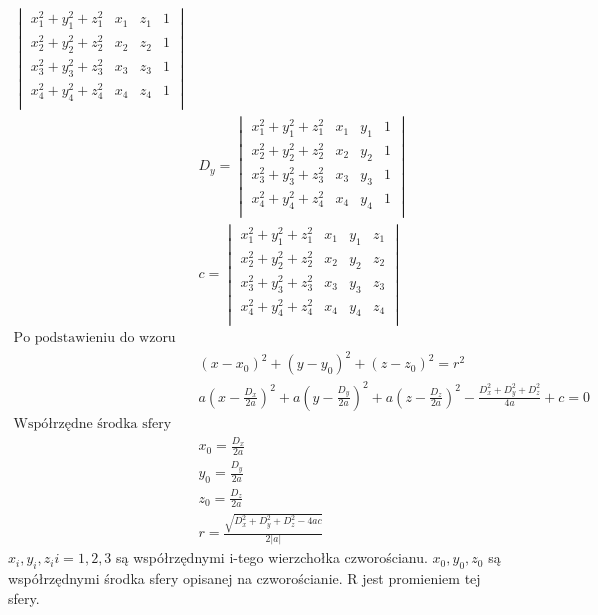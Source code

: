 \begin{equation}
\begin{aligned}
\begin{vmatrix}
                x_{1}^2+y_{1}^2+z_{1}^2 &x_{1}&z_{1}&1 \\
                x_{2}^2+y_{2}^2+z_{2}^2 &x_{2}&z_{2}&1 \\
                x_{3}^2+y_{3}^2+z_{3}^2 &x_{3}&z_{3}&1 \\
                x_{4}^2+y_{4}^2+z_{4}^2 &x_{4}&z_{4}&1 \\
            \end{vmatrix}\\
                &D_{y}=\begin{vmatrix}
                x_{1}^2+y_{1}^2+z_{1}^2 &x_{1}&y_{1}&1 \\
                x_{2}^2+y_{2}^2+z_{2}^2 &x_{2}&y_{2}&1 \\
                x_{3}^2+y_{3}^2+z_{3}^2 &x_{3}&y_{3}&1 \\
                x_{4}^2+y_{4}^2+z_{4}^2 &x_{4}&y_{4}&1 \\
            \end{vmatrix}\\
            &c=\begin{vmatrix}
                x_{1}^2+y_{1}^2+z_{1}^2 &x_{1}&y_{1}&z_{1} \\
                x_{2}^2+y_{2}^2+z_{2}^2 &x_{2}&y_{2}&z_{2} \\
                x_{3}^2+y_{3}^2+z_{3}^2 &x_{3}&y_{3}&z_{3} \\
                x_{4}^2+y_{4}^2+z_{4}^2 &x_{4}&y_{4}&z_{4} \\
            \end{vmatrix}\\
            \text{Po podstawieniu do wzoru sfery}\\
            &(x-x_{0})^2+(y-y_{0})^2+(z-z_{0})^2=r^2\\
            &a(x-\frac{D_{x}}{2a})^2+a(y-\frac{D_{y}}{2a})^2+a(z-\frac{D_{z}}{2a})^2-\frac{D_{x}^2+D_{y}^2+D_{z}^2}{4a}+c=0\\
            \text{Współrzędne środka sfery}\\
            &x_{0}=\frac{D_{x}}{2a}\\
            &y_{0}=\frac{D_{y}}{2a}\\
            &z_{0}=\frac{D_{z}}{2a}\\
            &r=\frac{\sqrt{D_{x}^2+D_{y}^2+D_{z}^2-4ac}}{2|a|}
    \end{aligned}
\end{equation}
$x_{i},y_{i},z_{i} i=1,2,3$ są współrzędnymi i-tego wierzchołka czworościanu. $x_{0},y_{0},z_{0}$ są współrzędnymi środka sfery opisanej na czworościanie. R jest promieniem tej sfery.

